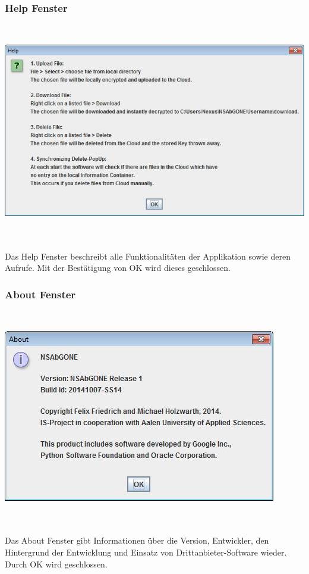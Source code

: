\documentclass[13pt,a4paper,bibliography=totocnumbered,listof=totocnumbered]{scrartcl}
\begin{document}
\subsubsection{Help Fenster}
$\;$\\
\begin{minipage}{\linewidth}
	\centering
	\includegraphics[width=0.4\linewidth]{./img/HelpPopUp.jpg}
	\label{HelpPopUp}
\end{minipage}
\\\\Das Help Fenster beschreibt alle Funktionalitäten der Applikation sowie deren Aufrufe. Mit der Bestätigung von OK wird dieses  geschlossen.

\subsubsection{About Fenster}
$\;$\\
\begin{minipage}{\linewidth}
	\centering
	\includegraphics[width=0.4\linewidth]{./img/AboutPopUp.jpg}
	\label{AboutPopUp}
\end{minipage}
\\\\Das About Fenster gibt Informationen über die Version, Entwickler, den Hintergrund der Entwicklung und Einsatz von Drittanbieter-Software wieder. Durch OK wird geschlossen.
\end{document}
